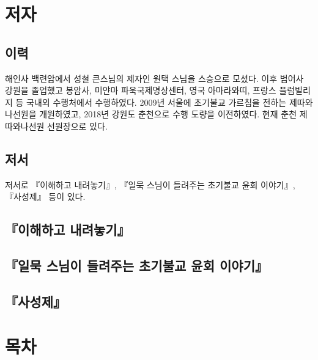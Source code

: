 \documentclass[12pt, a4paper, oneside]{book}
\begin{document}
	\newpage  \null
	\section{저자}

		\subsection{이력}
해인사 백련암에서 성철 큰스님의 제자인 원택 스님을 스승으로 모셨다. 
이후 범어사 강원을 졸업했고 봉암사, 미얀마 파욱국제명상센터, 영국 아마라와띠, 프랑스 플럼빌리지 등 국내외 수행처에서 수행하였다. 
2009년 서울에 초기불교 가르침을 전하는 제따와나선원을 개원하였고, 2018년 강원도 춘천으로 수행 도량을 이전하였다. 
현재 춘천 제따와나선원 선원장으로 있다. 

		\subsection{저서}

저서로 『이해하고 내려놓기』, 『일묵 스님이 들려주는 초기불교 윤회 이야기』, 『사성제』 등이 있다.

		\subsection{『이해하고 내려놓기』}
		\subsection{『일묵 스님이 들려주는 초기불교 윤회 이야기』}
		\subsection{ 『사성제』}



	\newpage  \null
	\section{목차}
\end{document}
